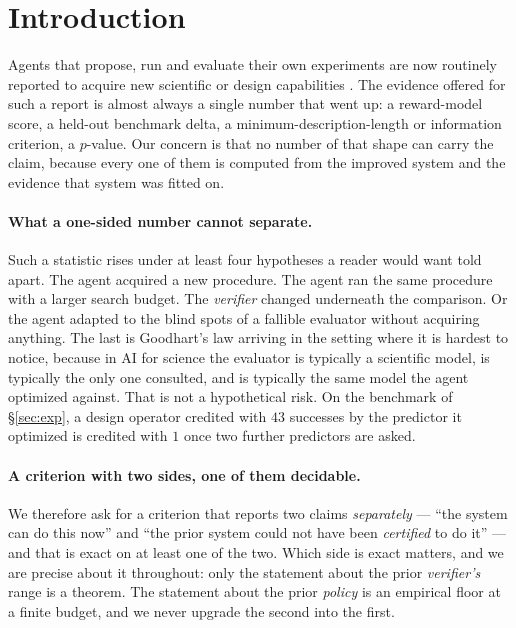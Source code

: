 \documentclass[11pt]{article}
\begin{document}
\section{Introduction}\label{sec:intro}
Agents that propose, run and evaluate their own experiments are now routinely reported to acquire new
scientific or design capabilities \citep{coscientist2025,agenticscience2025survey,voyager2023}. The evidence
offered for such a report is almost always a single number that went up: a reward-model score, a held-out
benchmark delta, a minimum-description-length or information criterion, a $p$-value. Our concern is that no
number of that shape can carry the claim, because every one of them is computed from the improved system and
the evidence that system was fitted on.

\paragraph{What a one-sided number cannot separate.} Such a statistic rises under at least four hypotheses a reader would want told apart. The agent acquired a new
procedure. The agent ran the same procedure with a larger search budget. The \emph{verifier} changed underneath
the comparison. Or the agent adapted to the blind spots of a fallible evaluator without acquiring anything. The last is Goodhart's law
\citep{amodei2016concrete,skalse2022,gao2023overopt} arriving in the setting where it is hardest to notice,
because in AI for science the evaluator is typically a scientific model, is typically the only one consulted,
and is typically the same model the agent optimized against. That is not a hypothetical risk. On the benchmark
of \S\ref{sec:exp}, a design operator credited with $43$ successes by the predictor it optimized is credited
with $1$ once two further predictors are asked.

\paragraph{A criterion with two sides, one of them decidable.} We therefore ask for a criterion that reports
two claims \emph{separately} --- ``the system can do this now'' and ``the prior system could not have been
\emph{certified} to do it'' --- and that is exact on at least one of the two. Which side is exact matters, and
we are precise about it throughout: only the statement about the prior \emph{verifier's} range is a theorem.
The statement about the prior \emph{policy} is an empirical floor at a finite budget, and we never upgrade the
second into the first.
\end{document}
